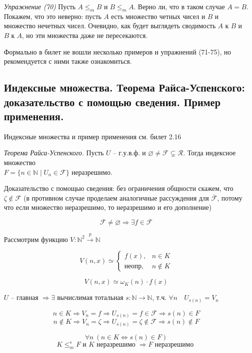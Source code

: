 \documentclass[a4paper, 10pt]{article}
\newcommand{\FF}{\mathcal{F}}
\newcommand{\RR}{\mathcal{R}}
\begin{document}
\hfill

\textit{Упражнение (70)} Пусть $A \leq_m B$ и $B \leq_m A$. Верно ли, что в таком случае $A = B$.
Покажем, что это неверно: пусть $A$ есть множество четных чисел и $B$ и множество нечетных чисел. Очевидно, как будет выглядеть сводимость $A$ к $B$ и $B$ к $A$, но эти множества даже не пересекаются.

\hfill

Формально в билет не вошли несколько примеров и упражнений (71-75), но рекомендуется с ними также ознакомиться.

\subsection{Индексные множества. Теорема Райса-Успенского: доказательство с помощью
сведения. Пример применения.}

Индексные множества и пример применения см. билет 2.16

\hfill

\textit{Теорема Райса-Успенского.} Пусть $U$ -- г.у.в.ф. и $\varnothing \ne \FF \subsetneq \RR$. Тогда индексное множество \\ $F = \{ n\in \mathbb{N} \mid U_n \in \FF \}$ неразрешимо.

Доказательство с помощью сведения: без ограничения общности скажем, что $\zeta \notin \FF$ (в противном случае проделаем аналогичные рассуждения для $\overline{\FF}$, потому что если множество неразрешимо, то неразрешимо и его дополнение)

$$ \FF \ne \varnothing \Rightarrow \exists f \in \FF $$

Рассмотрим функцию $V: \mathbb{N}^2 \stackrel{p}{\to} \mathbb{N}$

$$ V(n, x) \simeq \begin{cases}
    f(x), & n \in K \\
    \text{неопр}, & n \notin K
\end{cases} $$

$$ V(n, x) \simeq \omega_K(n) \cdot f(x) $$

$U$ -- главная $ \Rightarrow \exists $ вычислимая тотальная $s: \mathbb{N} \to \mathbb{N} $, т.ч. $\forall n \quad U_{s(n)}=V_n$

$$ n \in K \Rightarrow V_n = f \Rightarrow U_{s(n)} = f \in \FF \Rightarrow s(n) \in F $$
$$ n \notin K \Rightarrow V_n = \zeta \Rightarrow U_{s(n)} = \zeta \notin \FF \Rightarrow s(n) \notin F $$

$$ \forall n \: (n \in K \Leftrightarrow s(n) \in F)$$
$$ K \leqslant_m^s F \text{ и } K \text{ неразрешимо } \Rightarrow F \text{ неразрешимо } $$
\end{document}
